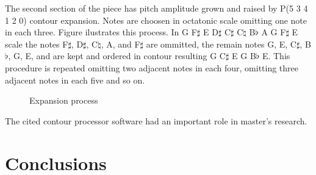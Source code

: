 The second section of the piece has pitch amplitude grown and raised
by P(5 3 4 1 2 0) contour expansion. Notes are choosen in octatonic
scale omitting one note in each three. Figure ilustrates this
process. In G F$\sharp$ E D$\sharp$ C$\sharp$ C$\natural$ B$\flat$ A G
F$\sharp$ E scale the notes F$\sharp$, D$\sharp$, C$\natural$, A, and
F$\sharp$ are ommitted, the remain notes G, E, C$\sharp$, B$\flat$, G,
E, and are kept and ordered in contour resulting G C$\sharp$ E G
B$\flat$ E. This procedure is repeated omitting two adjacent notes in
each four, omitting three adjacent notes in each five and so on.

\begin{figure}[!p]
  \centering

  \caption{Expansion process}
\end{figure}

The cited contour processor software had an important role in master's
research.

\section{Conclusions}
\label{sec:conclusions}

